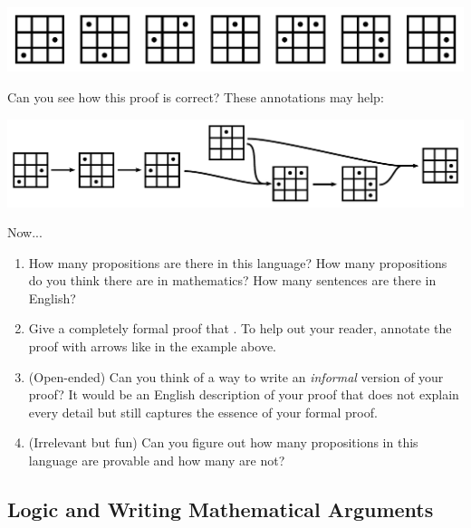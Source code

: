 \documentclass[12pt]{article}
\begin{document}
{\begin{center}
\includegraphics[scale=\s]{gridgame10.pdf}
\end{center}
Can you see how this proof is correct?
These annotations may help:
\begin{center}
\includegraphics[scale=\s]{gridgame12.pdf}
\end{center}
Now...
\begin{enumerate}
\item
How many propositions are there in this language?
How many propositions do you think there are in mathematics?
How many sentences are there in English?
\item
Give a completely formal proof that 
.
To help out your reader, annotate the proof with arrows like in the example above.
\item (Open-ended) Can you think of a way to write an \emph{informal} version of your proof?
It would be an English description of your proof that does not explain every detail but still captures the essence of your formal proof.
\item (Irrelevant but fun) Can you figure out how many propositions in this language are provable and how many are not?
\end{enumerate}
}



\subsection{Logic and Writing Mathematical Arguments}
\end{document}
